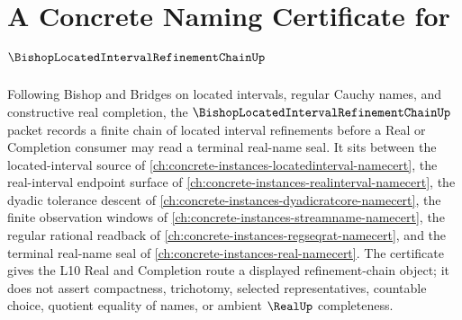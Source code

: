 \chapter{A Concrete Naming Certificate for $\BishopLocatedIntervalRefinementChainUp$}
\label{ch:concrete-instances-bishop-located-interval-refinement-chain-namecert}

Following Bishop and Bridges on located intervals, regular Cauchy names, and constructive real completion, the $\BishopLocatedIntervalRefinementChainUp$ packet records a finite chain of located interval refinements before a Real or Completion consumer may read a terminal real-name seal. It sits between the located-interval source of \autoref{ch:concrete-instances-locatedinterval-namecert}, the real-interval endpoint surface of \autoref{ch:concrete-instances-realinterval-namecert}, the dyadic tolerance descent of \autoref{ch:concrete-instances-dyadicratcore-namecert}, the finite observation windows of \autoref{ch:concrete-instances-streamname-namecert}, the regular rational readback of \autoref{ch:concrete-instances-regseqrat-namecert}, and the terminal real-name seal of \autoref{ch:concrete-instances-real-namecert}. The certificate gives the L10 Real and Completion route a displayed refinement-chain object; it does not assert compactness, trichotomy, selected representatives, countable choice, quotient equality of names, or ambient $\RealUp$ completeness.

